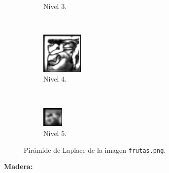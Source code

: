 \documentclass[12pt, letterpaper]{article}
\begin{document}
\begin{figure}[H]
\begin{subfigure}[t]{0.32\textwidth}
      \caption{Nivel 3.}
  \end{subfigure}
  ~ 
  \begin{subfigure}[t]{0.32\textwidth}
      \centering
      \includegraphics[width = 0.22\textwidth]{frutas/lp4.png}
      \caption{Nivel 4.}
  \end{subfigure}
  ~ 
  \begin{subfigure}[t]{0.32\textwidth}
      \centering
      \includegraphics[width = 0.11\textwidth]{frutas/lp5.png}
      \caption{Nivel 5.}
  \end{subfigure}
  \caption{Pirámide de Laplace de la imagen \texttt{frutas.png}.}
  \label{lpfrutas}
\end{figure}

\par \textbf{Madera:}
\end{document}
